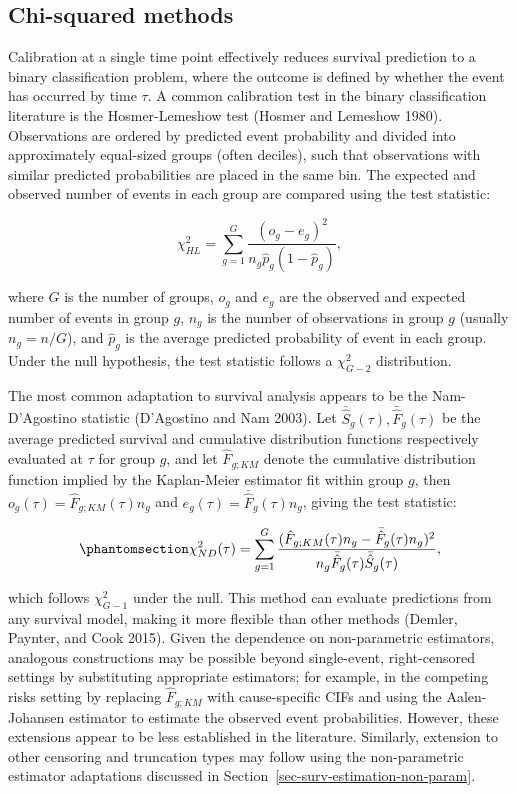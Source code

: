 \documentclass[
  letterpaper,
  krantz2]{style/krantz}
\begin{document}
\subsection{Chi-squared methods}\label{sec-calib-chi}

Calibration at a single time point effectively reduces survival
prediction to a binary classification problem, where the outcome is
defined by whether the event has occurred by time \(\tau\). A common
calibration test in the binary classification literature is the
Hosmer-Lemeshow test (Hosmer and Lemeshow 1980).
Observations are ordered by predicted event probability and divided into
approximately equal-sized groups (often deciles), such that observations
with similar predicted probabilities are placed in the same bin. The
expected and observed number of events in each group are compared using
the test statistic:

\[
\chi^2_{HL} = \sum^G_{g=1} \frac{(o_g - e_g)^2}{n_g\hat{p}_g(1 - \hat{p}_g)},
\]

where \(G\) is the number of groups, \(o_{g}\) and \(e_{g}\) are the
observed and expected number of events in group \(g\), \(n_g\) is the
number of observations in group \(g\) (usually \(n_g = n/G\)), and
\(\hat{p}_g\) is the average predicted probability of event in each
group. Under the null hypothesis, the test statistic follows a
\(\chi^2_{G-2}\) distribution.

The most common adaptation to survival analysis appears to be the
Nam-D'Agostino statistic (D'Agostino and Nam
2003). Let
\(\bar{\hat{S}}_g(\tau), \bar{\hat{F}}_g(\tau)\) be the average
predicted survival and cumulative distribution functions respectively
evaluated at \(\tau\) for group \(g\), and let \(\hat{F}_{g;KM}\) denote
the cumulative distribution function implied by the Kaplan-Meier
estimator fit within group \(g\), then
\(o_g(\tau) = \hat{F}_{g;KM}(\tau)n_g\) and
\(e_g(\tau) = \bar{\hat{F}}_{g}(\tau)n_g\), giving the test statistic:

\begin{equation}\phantomsection\label{eq-hosmer-nd}{
\chi^2_{ND}(\tau) = \sum^G_{g=1} \frac{(\hat{F}_{g;KM}(\tau)n_g - \bar{\hat{F}}_{g}(\tau)n_g)^2}{n_g\bar{\hat{F}}_{g}(\tau)\bar{\hat{S}}_{g}(\tau)},
}\end{equation}

which follows \(\chi^2_{G-1}\) under the null. This method can evaluate
predictions from any survival model, making it more flexible than other
methods (Demler, Paynter, and Cook 2015). Given the dependence on
non-parametric estimators, analogous constructions may be possible
beyond single-event, right-censored settings by substituting appropriate
estimators; for example, in the competing risks setting by replacing
\(\hat{F}_{g;KM}\) with cause-specific CIFs and using the Aalen-Johansen
estimator to estimate the observed event
probabilities. However, these extensions appear to be less established
in the literature. Similarly, extension to other censoring and
truncation types may follow using the non-parametric estimator
adaptations discussed in Section~\ref{sec-surv-estimation-non-param}.
\end{document}
